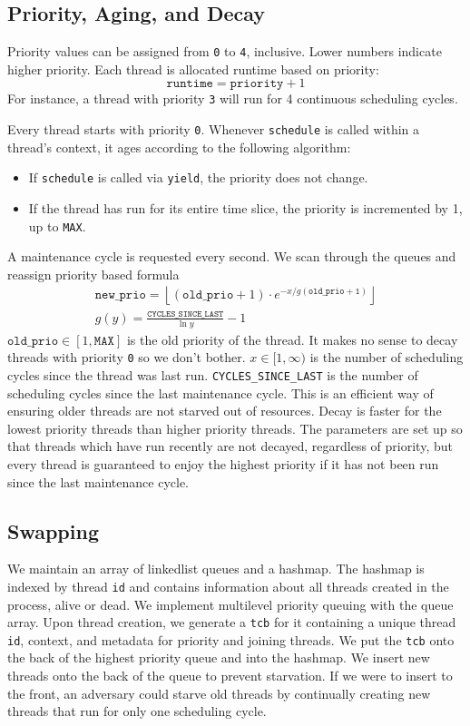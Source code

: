 \documentclass{article}
\begin{document}
\subsection{Priority, Aging, and Decay}
Priority values can be assigned from \verb|0| to \verb|4|, inclusive.
Lower numbers indicate higher priority.
Each thread is allocated runtime based on priority:
$$\mathtt{runtime} = {\mathtt{priority}} + 1$$
For instance, a thread with priority \verb|3| will run for 4 continuous scheduling cycles.

Every thread starts with priority \verb|0|. 
Whenever \verb|schedule| is called within a thread's context, it ages according to the following algorithm:
\begin{itemize}
\item If \verb|schedule| is called via \verb|yield|, the priority does not change.
\item If the thread has run for its entire time slice, the priority is incremented by 1, up to \verb|MAX|.
\end{itemize}

A maintenance cycle is requested every second. We scan through the queues and reassign priority based formula
\begin{gather*}
\mathtt{new\_prio} = \left\lfloor (\mathtt{old\_prio}+1) \cdot e^{-x/g(\mathtt{old\_prio+1})} \right\rfloor\\
g(y) = \frac{\mathtt{CYCLES\_SINCE\_LAST}}{\ln y} - 1
\end{gather*}
$\mathtt{old\_prio} \in [1,\mathtt{MAX}]$ is the old priority of the thread. It makes no sense to decay threads with priority \verb|0| so we don't bother. $x \in [1,\infty)$ is the number of scheduling cycles since the thread was last run. \verb|CYCLES_SINCE_LAST| is the number of scheduling cycles since the last maintenance cycle.
This is an efficient way of ensuring older threads are not starved out of resources. Decay is faster for the lowest priority threads than higher priority threads. The parameters are set up so that threads which have run recently are not decayed, regardless of priority, but every thread is guaranteed to enjoy the highest priority if it has not been run since the last maintenance cycle.

\subsection{Swapping}
We maintain an array of linkedlist queues and a hashmap.
The hashmap is indexed by thread \verb|id| and contains information about all threads created in the process, alive or dead.
We implement multilevel priority queuing with the queue array.
Upon thread creation, we generate a \verb|tcb| for it containing a unique thread \verb|id|, context, and metadata for priority and joining threads.
We put the \verb|tcb| onto the back of the highest priority queue and into the hashmap.
We insert new threads onto the back of the queue to prevent starvation.
If we were to insert to the front, an adversary could starve old threads by continually creating new threads that run for only one scheduling cycle.
\end{document}
